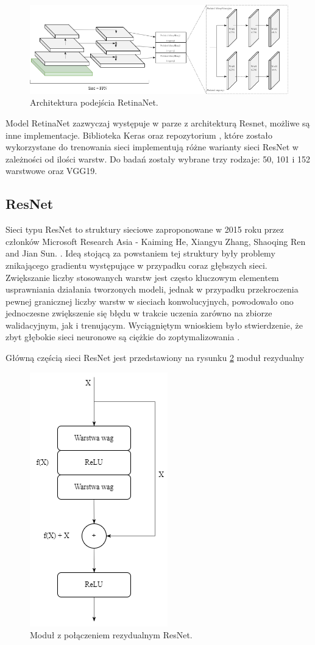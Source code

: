 \begin{figure}[H]
    \centering
    \includegraphics[width=0.9\linewidth]{Obrazy/Rozdzial04/retinanet.png}
    \caption{Architektura podejścia RetinaNet.}
    \label{fig:retinanet}
\end{figure}

Model RetinaNet zazwyczaj występuje w parze z architekturą Resnet, możliwe są inne implementacje. Biblioteka Keras oraz repozytorium \cite{Fizyr}, które zostało wykorzystane do trenowania sieci implementują różne warianty sieci ResNet w zależności od ilości warstw. Do badań zostały wybrane trzy rodzaje: 50, 101 i 152 warstwowe oraz VGG19.

\subsection{ResNet}
\hspace{0.5cm}
Sieci typu ResNet to struktury sieciowe zaproponowane w 2015 roku przez członków Microsoft Research Asia - Kaiming He, Xiangyu Zhang, Shaoqing Ren and Jian Sun. \cite{ResNet}. Ideą stojącą za powstaniem tej struktury były problemy znikającego gradientu występujące w przypadku coraz głębszych sieci. Zwiększanie liczby stosowanych warstw jest często kluczowym elementem usprawniania działania tworzonych modeli, jednak w przypadku przekroczenia pewnej granicznej liczby warstw w sieciach konwolucyjnych, powodowało ono jednoczesne zwiększenie się błędu w trakcie uczenia zarówno na zbiorze walidacyjnym, jak i trenującym. Wyciągniętym wnioskiem było stwierdzenie, że zbyt głębokie sieci neuronowe są ciężkie do zoptymalizowania  \cite{ResNet}.

Główną częścią sieci ResNet jest przedstawiony na rysunku \ref{fig:resnet} moduł rezydualny

\begin{figure}[H]
    \centering
    \includegraphics[width=0.3\linewidth]{Obrazy/Rozdzial04/modelrezydualny.png}
    \caption{Moduł z połączeniem rezydualnym ResNet.}
    \label{fig:resnet}
\end{figure}

